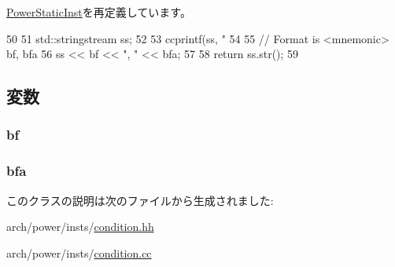 \hyperlink{classPowerISA_1_1PowerStaticInst_a95d323a22a5f07e14d6b4c9385a91896}{PowerStaticInst}を再定義しています。


\begin{DoxyCode}
50 {
51     std::stringstream ss;
52 
53     ccprintf(ss, "%
54 
55     // Format is <mnemonic> bf, bfa
56     ss << bf << ", " << bfa;
57 
58     return ss.str();
59 }
\end{DoxyCode}


\subsection{変数}
\hypertarget{classPowerISA_1_1CondMoveOp_aef9d89f66473031c63ee358d34cdc3f5}{
\subsubsection[{bf}]{ {\bf bf}}}
\label{classPowerISA_1_1CondMoveOp_aef9d89f66473031c63ee358d34cdc3f5}
\hypertarget{classPowerISA_1_1CondMoveOp_a136f3096a91e43c92c66b6f5b7be69b8}{
\subsubsection[{bfa}]{ {\bf bfa}}}
\label{classPowerISA_1_1CondMoveOp_a136f3096a91e43c92c66b6f5b7be69b8}


このクラスの説明は次のファイルから生成されました:\begin{DoxyCompactItemize}
\item 
arch/power/insts/\hyperlink{condition_8hh}{condition.hh}\item 
arch/power/insts/\hyperlink{condition_8cc}{condition.cc}\end{DoxyCompactItemize}
